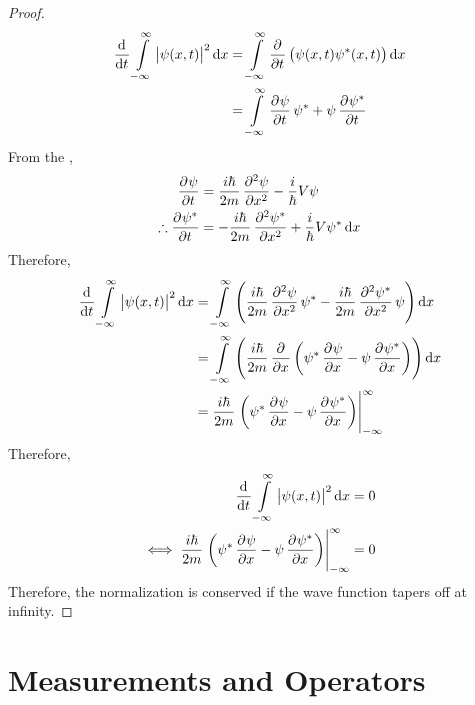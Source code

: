 \documentclass[titlepage, fleqn, a4paper, 12pt, twoside]{article}
\theoremstyle{definition}
\theoremstyle{theorem}
\begin{document}
\begin{proof}
	\begin{align*}
		\dod{}{t} \int\limits_{-\infty}^{\infty} \left| \psi(x,t) \right|^2 \dif x & = \int\limits_{-\infty}^{\infty} \dpd{}{t} \left( \psi(x,t) \psi^*(x,t) \right) \dif x \\
                                                                                           & = \int\limits_{-\infty}^{\infty} \dpd{\psi}{t} \psi^* + \psi \dpd{\psi^*}{t}
	\end{align*}
	From the ,
	\begin{align*}
		\dpd{\psi}{t}              & = \frac{i \hbar}{2 m} \dpd[2]{\psi}{x} - \frac{i}{\hbar} V \psi \\
		\therefore \dpd{\psi^*}{t} & = -\frac{i \hbar}{2 m} \dpd[2]{\psi^*}{x} + \frac{i}{\hbar} V \psi^* \dif x
	\end{align*}
	Therefore,
	\begin{align*}
		\dod{}{t} \int\limits_{-\infty}^{\infty} \left| \psi(x,t) \right|^2 \dif x & = \int\limits_{-\infty}^{\infty} \left( \frac{i \hbar}{2 m} \dpd[2]{\psi}{x} \psi^* - \frac{i \hbar}{2 m} \dpd[2]{\psi^*}{x} \psi \right) \dif x \\
                                                                                           & = \int\limits_{-\infty}^{\infty} \left( \frac{i \hbar}{2 m} \dpd{}{x}\left( \psi^* \dpd{\psi}{x} - \psi \dpd{\psi^*}{x} \right) \right) \dif x   \\
                                                                                           & = \frac{i \hbar}{2 m} \left. \left( \psi^* \dpd{\psi}{x} - \psi \dpd{\psi^*}{x} \right) \right|_{-\infty}^{\infty}
	\end{align*}
	Therefore,
	\begin{align*}
		\dod{}{t} \int\limits_{-\infty}^{\infty} \left| \psi(x,t) \right|^2 \dif x                                            & = 0 \\
		\iff \frac{i \hbar}{2 m} \left. \left( \psi^* \dpd{\psi}{x} - \psi \dpd{\psi^*}{x} \right) \right|_{-\infty}^{\infty} & = 0
	\end{align*}
	Therefore, the normalization is conserved if the wave function tapers off at infinity.
\end{proof}

\section{Measurements and Operators}
\end{document}

